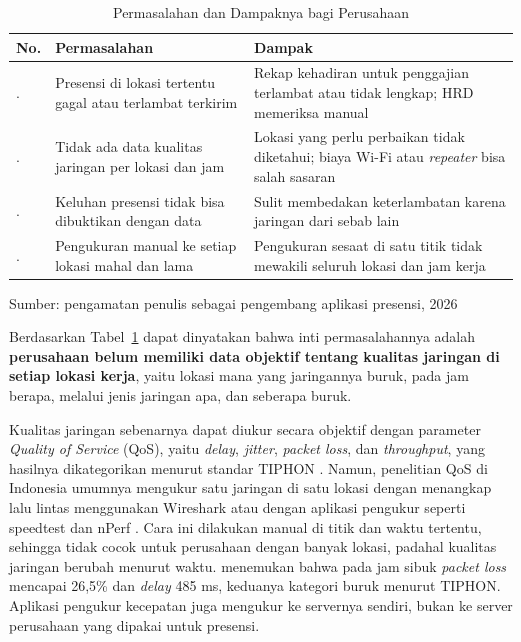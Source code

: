 \begin{table}[!ht]
\centering
\caption{Permasalahan dan Dampaknya bagi Perusahaan}
\label{tab:permasalahan}
\begin{tabular}{>{\centering\arraybackslash}p{0.8cm}>{\raggedright\arraybackslash}p{5.0cm}>{\raggedright\arraybackslash}p{7.14cm}}
\toprule
\textbf{No.} & \textbf{Permasalahan} & \textbf{Dampak} \\ \midrule
1. & Presensi di lokasi tertentu gagal atau terlambat terkirim & Rekap kehadiran untuk penggajian terlambat atau tidak lengkap; HRD memeriksa manual \\ \garis
2. & Tidak ada data kualitas jaringan per lokasi dan jam & Lokasi yang perlu perbaikan tidak diketahui; biaya Wi-Fi atau \textit{repeater} bisa salah sasaran \\ \garis
3. & Keluhan presensi tidak bisa dibuktikan dengan data & Sulit membedakan keterlambatan karena jaringan dari sebab lain \\ \garis
4. & Pengukuran manual ke setiap lokasi mahal dan lama & Pengukuran sesaat di satu titik tidak mewakili seluruh lokasi dan jam kerja \\ \bottomrule
\end{tabular}
\par\vspace{3pt}
{\raggedright\footnotesize Sumber: pengamatan penulis sebagai pengembang aplikasi presensi, 2026\par}
\end{table}

Berdasarkan Tabel~\ref{tab:permasalahan} dapat dinyatakan bahwa inti permasalahannya adalah \textbf{perusahaan belum memiliki data objektif tentang kualitas jaringan di setiap lokasi kerja}, yaitu lokasi mana yang jaringannya buruk, pada jam berapa, melalui jenis jaringan apa, dan seberapa buruk.

Kualitas jaringan sebenarnya dapat diukur secara objektif dengan parameter \textit{Quality of Service} (QoS), yaitu \textit{delay}, \textit{jitter}, \textit{packet loss}, dan \textit{throughput}, yang hasilnya dikategorikan menurut standar TIPHON \parencite{etsi1999tiphon,rosid2023qos}. Namun, penelitian QoS di Indonesia umumnya mengukur satu jaringan di satu lokasi dengan menangkap lalu lintas menggunakan Wireshark \parencite{rosid2023qos,fiqria2024qos,basmar2026jamsibuk} atau dengan aplikasi pengukur seperti speedtest dan nPerf \parencite{ramayanti2024qos,ainina2024qos4g}. Cara ini dilakukan manual di titik dan waktu tertentu, sehingga tidak cocok untuk perusahaan dengan banyak lokasi, padahal kualitas jaringan berubah menurut waktu. \textcite{basmar2026jamsibuk} menemukan bahwa pada jam sibuk \textit{packet loss} mencapai 26,5\% dan \textit{delay} 485 ms, keduanya kategori buruk menurut TIPHON. Aplikasi pengukur kecepatan juga mengukur ke servernya sendiri, bukan ke server perusahaan yang dipakai untuk presensi.

